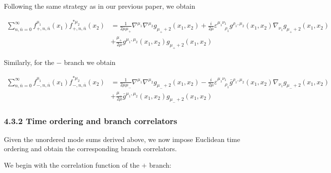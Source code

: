 Following the same strategy as in our previous paper, we obtain

\begin{align}
\sum ^{\infty}_{n,\bar{n}=0}f_{+,n,\bar{n}}^{\mu_{1}}(x_{1})f^{*\mu_{2}}_{+,n,\bar{n}}(x_{2}) & = \frac{1}{2\bar{\mu}\mu _{+}}\nabla ^{\mu_{1}}\nabla ^{\mu_{2}} g_{\mu _{+}+2}(x_{1},x_{2})+\frac{i}{2\bar{\mu}}\varepsilon ^{\mu_{1}\nu_{1}}_{~~~~~~~\rho_{1}}g^{\rho_{1},\mu_{2}}(x_{1},x_{2}) \nabla _{\nu_{1}}g_{\mu _{+}+2}(x_{1},x_{2}) \\
 & +\frac{\mu _{+}}{2\bar{\mu}}g^{\mu_{1},\mu_{2}}(x_{1},x_{2})g_{\mu _{+}+2}(x_{1},x_{2})
\end{align}

Similarly, for the $-$ branch we obtain

\begin{align}
\sum ^{\infty}_{n,\bar{n}=0}f_{-,n,\bar{n}}^{\mu_{1}}(x_{1})f^{*\mu_{2}}_{-,n,\bar{n}}(x_{2}) & =\frac{1}{2\bar{\mu}\mu _{-}}\nabla ^{\mu_{1}}\nabla ^{\mu_{2}}g_{\mu _{-}+2}(x_{1},x_{2})-\frac{i}{2\bar{\mu}}\varepsilon ^{\mu_{1}\nu_{1}}_{~~~~~~~\rho_{1}}\bar{g}^{\rho_{1},\mu_{2}}(x_{1},x_{2})\nabla _{\nu_{1}}g_{\mu _{-}+2}(x_{1},x_{2}) \\
 & +\frac{\mu _{-}}{2\bar{\mu}}\bar{g}^{\mu_{1},\mu_{2}}(x_{1},x_{2})g_{\mu _{-}+2}(x_{1},x_{2})
\end{align}

\subsubsection{4.3.2 Time ordering and branch correlators}\label{subsubsec:time-ordering-branch-correlators}

Given the unordered mode sums derived above, we now impose Euclidean time ordering and obtain the corresponding branch correlators.

We begin with the correlation function of the $+$ branch:

